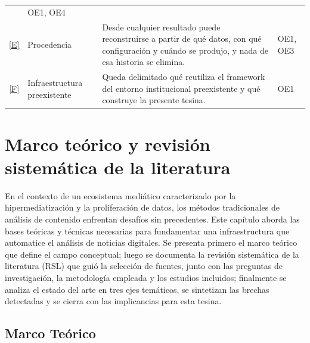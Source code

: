 \documentclass[12pt]{report}
\DeclareRobustCommand{\resp}[1]{\hyperref[tab:registro-responsabilidades]{\textcolor{respcolor}{[#1]}}}
\begin{document}
\begin{table}[H]
\begin{tabularx}{\textwidth}{@{}c >{\raggedright\arraybackslash}p{2.9cm} X l@{}}
                      & OE1, OE4                                                                                                                                                                                                                                   \\
    \addlinespace
    \resp{E}          & Procedencia
                      & Desde cualquier resultado puede reconstruirse a partir de qué datos, con qué configuración y cuándo se produjo, y nada de esa historia se elimina.
                      & OE1, OE3                                                                                                                                                                                                                                   \\
    \addlinespace
    \resp{F}          & Infraestructura preexistente
                      & Queda delimitado qué reutiliza el framework del entorno institucional preexistente y qué construye la presente tesina.
                      & OE1                                                                                                                                                                                                                                        \\
    \bottomrule
  \end{tabularx}
\end{table}

\chapter{Marco teórico y revisión sistemática de la literatura}
\label{cap:rsl}

En el contexto de un ecosistema mediático caracterizado por la hipermediatización y la proliferación de datos, los métodos tradicionales de análisis de contenido enfrentan desafíos sin precedentes. Este capítulo aborda las bases teóricas y técnicas necesarias para fundamentar una infraestructura que automatice el análisis de noticias digitales. Se presenta primero el marco teórico que define el campo conceptual; luego se documenta la revisión sistemática de la literatura (RSL) que guió la selección de fuentes, junto con las preguntas de investigación, la metodología empleada y los estudios incluidos; finalmente se analiza el estado del arte en tres ejes temáticos, se sintetizan las brechas detectadas y se cierra con las implicancias para esta tesina.

\section{Marco Teórico}
\label{sec:rsl-marco}
\end{document}
